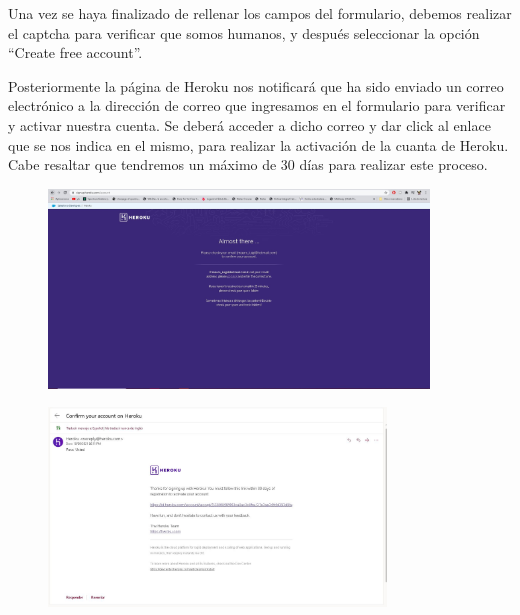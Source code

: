 \documentclass[10pt,a4paper]{article} %
\begin{document}
\begin{enumerate}
{			\pagebreak
			Una vez se haya finalizado de rellenar los campos del formulario, debemos realizar el captcha para verificar que somos humanos, y despu{\'e}s seleccionar la opci{\'o}n ``Create free account''.
			
			\item Posteriormente la p{\'a}gina de Heroku nos notificar{\'a} que ha sido enviado un correo electr{\'o}nico a la direcci{\'o}n de correo que ingresamos en el formulario para verificar y activar nuestra cuenta. Se deber{\'a} acceder a dicho correo y dar click al enlace que se nos indica en el mismo, para realizar la activaci{\'o}n de la cuanta de Heroku. Cabe resaltar que tendremos un m{\'a}ximo de 30 d{\'i}as para realizar este proceso.
			\begin{figure}[H]
				\includegraphics[width=0.9\textwidth]{3.jpg}
				\centering
				\label{img:paso3}
				
				
				\vspace{0.5cm}
				\includegraphics[width=0.8\textwidth]{4.jpg}
				\centering
				\label{img:paso4}
			\end{figure}
			
}
\end{enumerate}
\end{document}
